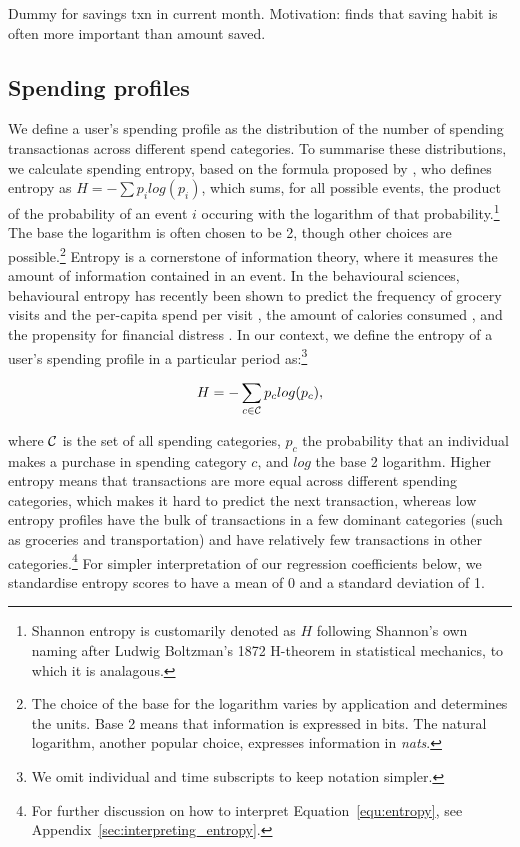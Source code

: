 Dummy for savings txn in current month. Motivation: \citet{mps2018building} finds that
saving habit is often more important than amount saved.


\subsection{Spending profiles}%
\label{sub:spending_profiles}

We define a user's spending profile as the distribution of the number of
spending transactionas across different spend categories. To summarise these
distributions, we calculate spending entropy, based on the formula proposed by
\citet{shannon1948mathematical}, who defines entropy as $H =
-\sum{p_i}log(p_i)$, which sums, for all possible events, the product of the
probability of an event $i$ occuring with the logarithm of that
probability.\footnote{Shannon entropy is customarily denoted as $H$ following
    Shannon's own naming after Ludwig Boltzman's 1872 H-theorem in statistical
    mechanics, to which it is analagous.} The base the logarithm is often
    chosen to be 2, though other choices are possible.\footnote{The choice of
        the base for the logarithm varies by application and determines the
        units. Base 2 means that information is expressed in bits. The
natural logarithm, another popular choice, expresses information in
\textit{nats}.} Entropy is a cornerstone of information theory, where it
measures the amount of information contained in an event. In the behavioural
sciences, behavioural entropy has recently been shown to predict the frequency
of grocery visits and the per-capita spend per visit
\citep{guidotti2015behavioral}, the amount of calories consumed
\citep{skatova2019those}, and the propensity for financial distress
\citep{muggleton2020evidence}. In our context, we define the entropy of a
user's spending profile in a particular period as:\footnote{We omit individual
and time subscripts to keep notation simpler.}

\begin{equation}
\label{equ:entropy}
H = -\sum_{c \in \mathcal{C}}{p_c}log(p_c),
\end{equation}

\noindent where $\mathcal{C}$ is the set of all spending categories, $p_c$ the
probability that an individual makes a purchase in spending category $c$, and
$log$ the base 2 logarithm. Higher entropy means that transactions are more
equal across different spending categories, which makes it hard to predict the
next transaction, whereas low entropy profiles have the bulk of transactions in
a few dominant categories (such as groceries and transportation) and have
relatively few transactions in other categories.\footnote{For further
discussion on how to interpret Equation~\ref{equ:entropy}, see
Appendix~\ref{sec:interpreting_entropy}.} For simpler interpretation of our
regression coefficients below, we standardise entropy scores to have a mean of
0 and a standard deviation of 1.

